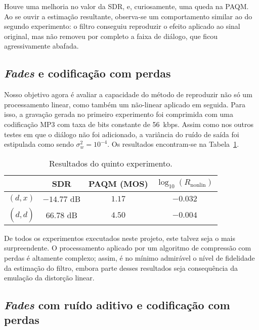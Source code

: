 Houve uma melhoria no valor da SDR, e, curiosamente, uma queda na PAQM. Ao se ouvir a estimação resultante, observa-se um comportamento similar ao do segundo experimento: o filtro conseguiu reproduzir o efeito aplicado ao sinal original, mas não removeu por completo a faixa de diálogo, que ficou agressivamente abafada.

\subsection{\textit{Fades} e codificação com perdas}

Nosso objetivo agora é avaliar a capacidade do método de reproduzir não só um processamento linear, como também um não-linear aplicado em seguida. Para isso, a gravação gerada no primeiro experimento foi comprimida com uma codificação MP3 com taxa de bits constante de 56~kbps. Assim como nos outros testes em que o diálogo não foi adicionado, a variância do ruído de saída foi estipulada como sendo $\sigma_w^2 = 10^{-4}$. Os resultados encontram-se na Tabela~\ref{tab:unscented:experiment-5}.
{\def\arraystretch{1.25}\tabcolsep=10pt
\begin{table}[!ht]
    \centering
    \caption[Resultados do quinto experimento: \textit{fades} e codificação com perdas]{Resultados do quinto experimento.}
    \label{tab:unscented:experiment-5}
    \begin{tabular}{cccc}
        \toprule
                         & SDR        & PAQM (MOS)   & $\log_{10}(R_{\text{nonlin}})$ \\
        \midrule
        $(d, x)$       & $-14.77$ dB & $1.17$  &  $-0.032$               \\
        $(d, \hat{d})$ & $66.78$ dB & $4.50$  &   $-0.004$              \\ \bottomrule
    \end{tabular}
\end{table}
}

De todos os experimentos executados neste projeto, este talvez seja o mais surpreendente. O processamento aplicado por um algoritmo de compressão com perdas é altamente complexo; assim, é no mínimo admirável o nível de fidelidade da estimação do filtro, embora parte desses resultados seja consequência da emulação da distorção linear.

\subsection{\textit{Fades} com ruído aditivo e codificação com perdas}

